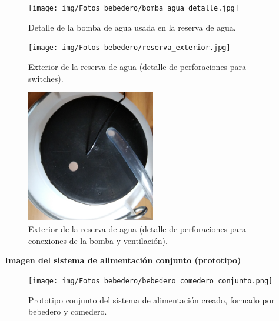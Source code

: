 \documentclass[12pt]{article}
\begin{document}
	\pagebreak
	
	\begin{figure}[h]
		\begin{center}
			\texttt{[image: img/Fotos bebedero/bomba\_agua\_detalle.jpg]}
			\caption{Detalle de la bomba de agua usada en la reserva de agua.}
			\label{Prototipo: bomba agua (detalle)}
		\end{center}
	\end{figure}
	
	\pagebreak
	
	\begin{figure}[h]
		\begin{center}
			\texttt{[image: img/Fotos bebedero/reserva\_exterior.jpg]}
			\caption{Exterior de la reserva de agua (detalle de perforaciones para switches).}
			\label{Prototipo: reserva agua (detalle exterior)}
		\end{center}
	\end{figure}
	
	\pagebreak
	
	\begin{figure}[h]
		\begin{center}
			\includegraphics[width=0.5\textwidth]{img/Fotos bebedero/agujeros_reserva_superior.png}
			\caption{Exterior de la reserva de agua (detalle de perforaciones para conexiones de la bomba y ventilación).}
			\label{Prototipo: reserva agua (detalle exterior superior)}
		\end{center}
	\end{figure}
	
	\pagebreak
	
	\noindent \textbf{Imagen del sistema de alimentación conjunto (prototipo)} \\

	\begin{figure}[h]
		\begin{center}
			\texttt{[image: img/Fotos bebedero/bebedero\_comedero\_conjunto.png]}
			\caption{Prototipo conjunto del sistema de alimentación creado, formado por bebedero y comedero.}
			\label{Prototipo: conjunto bebedero comedero}
		\end{center}
	\end{figure}
\end{document}
